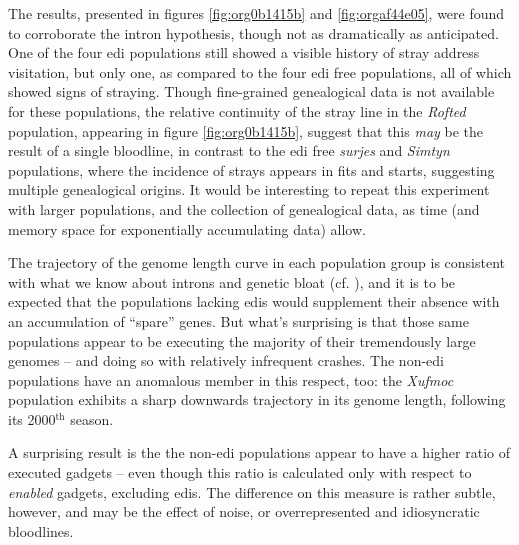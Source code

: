 \documentclass[12pt,glossary]{dalthesis}
\begin{document}
The results, presented in figures \ref{fig:org0b1415b} and
\ref{fig:orgaf44e05}, were found to corroborate the intron hypothesis,
though not as dramatically as anticipated. One of the four \gls{edi} populations
still showed a visible history of stray address visitation, but only one, as
compared to the four \gls{edi} free populations, all of which showed signs of
straying. Though fine-grained genealogical data is not available for these
populations, the relative continuity of the stray line in the \emph{Rofted} population, 
appearing in figure \ref{fig:org0b1415b}, suggest that this \emph{may} be the
result of a single bloodline, in contrast to the \gls{edi} free \emph{surjes} and 
\emph{Simtyn} populations, where the incidence of strays appears in fits and starts, 
suggesting multiple genealogical origins. It would be interesting to repeat this
experiment with larger populations, and the collection of genealogical data, 
as time (and memory space for exponentially accumulating data) allow. 

The trajectory of the genome length curve in each population group is consistent
with what we know about introns and genetic bloat (cf. \cite{banzhaf98}), and
it is to be expected that the populations lacking \glspl{edi} would supplement
their absence with an accumulation of ``spare'' genes. But what's surprising is
that those same populations appear to be executing the majority of their
tremendously large genomes -- and doing so with relatively infrequent crashes. 
The non-\gls{edi} populations have an anomalous member in this respect, too:
the \emph{Xufmoc} population exhibits a sharp downwards trajectory in its genome
length, following its 2000\(^{\text{th}}\) season.  

A surprising result is the the non-\gls{edi} populations appear to have a higher
ratio of executed gadgets -- even though this ratio is calculated only with respect
to \emph{enabled} gadgets, excluding \glspl{edi}. The difference on this measure is rather
subtle, however, and may be the effect of noise, or overrepresented and idiosyncratic
bloodlines. 
\end{document}
